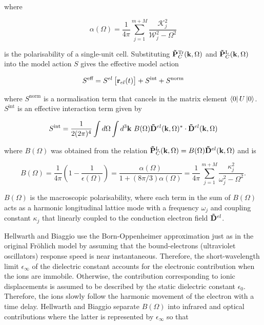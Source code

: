 where

\begin{equation}
    \alpha(\Omega) = \frac{1}{4\pi} \sum_{j=1}^{m+M} \frac{\mathcal{K}_j^2}{\mathcal{W}_j^2 - \Omega^2}
\end{equation}

is the polarisability of a single-unit cell. Substituting $\vb{\Tilde{P}}^{\text{Tr}}_{C}(\vb{k}, \Omega)$ and $\vb{\Tilde{P}}^{\text{L}}_{C}(\vb{k}, \Omega)$ into the model action $S$ gives the effective model action 

\begin{equation}
    S^{\text{eff}} = S^{el}\left[ \vb{r}_{el}(t) \right] + S^{\text{int}} + S^{\text{norm}}
\end{equation}

where $S^{\text{norm}}$ is a normalisation term that cancels in the matrix element $\bra{0} U \ket{0}$. $S^{\text{int}}$ is an effective interaction term given by

\begin{equation}
    S^{\text{int}} = \frac{1}{2 (2\pi)^4} \int d\Omega \int d^3 \vb{k}\ B(\Omega) \vb{\Tilde{D}}^{el}(\vb{k}, \Omega)^* \cdot \vb{\Tilde{D}}^{el}(\vb{k}, \Omega)
\end{equation}

where $B(\Omega)$ was obtained from the relation $\vb{\Tilde{P}}^{\text{L}}_{C}(\vb{k}, \Omega) = B(\Omega) \vb{\Tilde{D}}^{el}(\vb{k}, \Omega)$ and is

\begin{equation}
    B(\Omega) = \frac{1}{4\pi} \left( 1 - \frac{1}{\epsilon(\Omega)} \right) = \frac{\alpha(\Omega)}{1+(8\pi/3)\alpha(\Omega)} = \frac{1}{4\pi} \sum_{j = 1}^{m + M} \frac{\kappa_j^2}{\omega_j^2 - \Omega^2}.
\end{equation}

$B(\Omega)$ is the macroscopic polarisability, where each term in the sum of $B(\Omega)$ acts as a harmonic longitudinal lattice mode with a frequency $\omega_j$ and coupling constant $\kappa_j$ that linearly coupled to the conduction electron field $\vb{\Tilde{D}}^{el}$. 

Hellwarth and Biaggio use the Born-Oppenheimer approximation just as in the original Fr\"ohlich model by assuming that the bound-electrons (ultraviolet oscillators) response speed is near instantaneous. Therefore, the short-wavelength limit $\epsilon_\infty$ of the dielectric constant accounts for the electronic contribution when the ions are immobile. Otherwise, the contribution corresponding to ionic displacements is assumed to be described by the static dielectric constant $\epsilon_0$. Therefore, the ions slowly follow the harmonic movement of the electron with a time delay. Hellwarth and Biaggio separate $B(\Omega)$ into infrared and optical contributions where the latter is represented by $\epsilon_\infty$ so that

